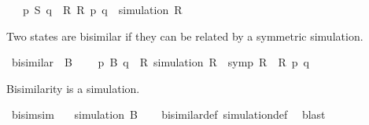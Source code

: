 \begin{isabellebody}
\ \ \ {\isacartoucheopen}p\ {\isasymlesssim}S\ q\ {\isasymequiv}\ {\isasymexists}R{\isachardot}{\kern0pt}\ R\ p\ q\ {\isasymand}\ simulation\ R{\isacartoucheclose}%
\begin{isamarkuptext}%
Two states are bisimilar if they can be related by a symmetric simulation.%
\end{isamarkuptext}\isamarkuptrue%
\isamarkupfalse%
\ bisimilar\ {\isacharparenleft}{\kern0pt}\ {\isacartoucheopen}{\isasymsimeq}B{\isacartoucheclose}\ {}{}{\isacharparenright}{\kern0pt}\ \isanewline
\ \ {\isacartoucheopen}p\ {\isasymsimeq}B\ q\ {\isasymequiv}\ {\isasymexists}R{\isachardot}{\kern0pt}\ simulation\ R\ {\isasymand}\ symp\ R\ {\isasymand}\ R\ p\ q{\isacartoucheclose}%
\begin{isamarkuptext}%
Bisimilarity is a simulation.%
\end{isamarkuptext}\isamarkuptrue%
\isamarkupfalse%
\ bisim{\isacharunderscore}{\kern0pt}sim{\isacharcolon}{\kern0pt}\isanewline
\ \ \ {\isacartoucheopen}simulation\ {\isacharparenleft}{\kern0pt}{\isasymsimeq}B{\isacharparenright}{\kern0pt}{\isacartoucheclose}\isanewline
%
\isadelimproof
\ \ %
\endisadelimproof
%
\isatagproof
{}\isamarkupfalse%
\ bisimilar{\isacharunderscore}{\kern0pt}def\ simulation{\isacharunderscore}{\kern0pt}def\ \isamarkupfalse%
\ blast%
\endisatagproof
{\isafoldproof}%
%
\isadelimproof
\isanewline
%
\endisadelimproof
\isanewline
\isanewline
{}\isamarkupfalse%
\isanewline
%
\isadelimtheory
%
\endisadelimtheory
%
\isatagtheory
{}\isamarkupfalse%
%
\endisatagtheory
{\isafoldtheory}%
%
\isadelimtheory
%
\endisadelimtheory
%
\end{isabellebody}%
\endinput
